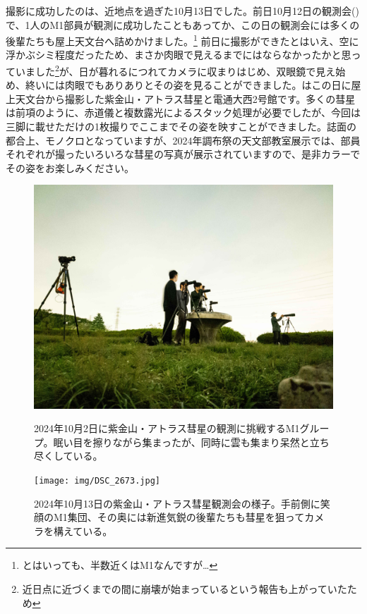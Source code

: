 \documentclass{supernova_pre}
\begin{document}
撮影に成功したのは、近地点を過ぎた10月13日でした。前日10月12日の観測会()で、1人のM1部員が観測に成功したこともあってか、この日の観測会には多くの後輩たちも屋上天文台へ詰めかけました。\footnote{とはいっても、半数近くはM1なんですが…} 前日に撮影ができたとはいえ、空に浮かぶシミ程度だったため、まさか肉眼で見えるまでにはならなかったかと思っていました\footnote{近日点に近づくまでの間に崩壊が始まっているという報告も上がっていたため}が、日が暮れるにつれてカメラに収まりはじめ、双眼鏡で見え始め、終いには肉眼でもありありとその姿を見ることができました。はこの日に屋上天文台から撮影した紫金山・アトラス彗星と電通大西2号館です。多くの彗星は前項のように、赤道儀と複数露光によるスタック処理が必要でしたが、今回は三脚に載せただけの1枚撮りでここまでその姿を映すことができました。誌面の都合上、モノクロとなっていますが、2024年調布祭の天文部教室展示では、部員それぞれが撮ったいろいろな彗星の写真が展示されていますので、是非カラーでその姿をお楽しみください。
\begin{figure}[H]
  \centering
  \begin{minipage}{0.49\columnwidth}
    \centering
    \includegraphics[width=\textwidth]{img/20241002_044541.jpg}
    \caption{2024年10月2日に紫金山・アトラス彗星の観測に挑戦するM1グループ。眠い目を擦りながら集まったが、同時に雲も集まり呆然と立ち尽くしている。}
    \label{fig:1002}
  \end{minipage}
  \begin{minipage}{0.49\columnwidth}
    \centering
    \texttt{[image: img/DSC\_2673.jpg]}
    \caption{2024年10月13日の紫金山・アトラス彗星観測会の様子。手前側に笑顔のM1集団、その奥には新進気鋭の後輩たちも彗星を狙ってカメラを構えている。}
    \label{fig:1013}
    \end{minipage}
\end{figure}
\end{document}
